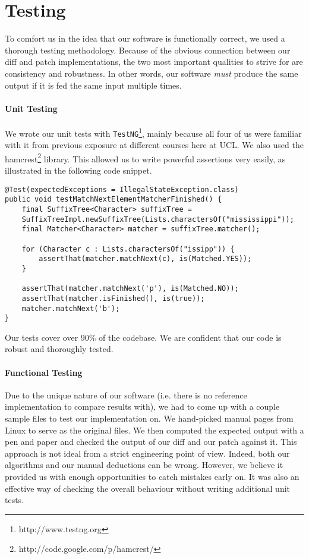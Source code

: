 \section{Testing}

To comfort us in the idea that our software is functionally correct, we used a thorough testing methodology. Because of the obvious connection between our diff and patch implementations, the two most important qualities to strive for are consistency and robustness. In other words, our software \textit{must} produce the same output if it is fed the same input multiple times.

\paragraph{Unit Testing}
We wrote our unit tests with \texttt{TestNG}\footnote{http://www.testng.org}, mainly because all four of us were familiar with it from previous exposure at different courses here at UCL. We also used the hamcrest\footnote{http://code.google.com/p/hamcrest/} library. This allowed us to write powerful assertions very easily, as illustrated in the following code snippet.

\begin{lstlisting}
@Test(expectedExceptions = IllegalStateException.class)
public void testMatchNextElementMatcherFinished() {
    final SuffixTree<Character> suffixTree = 
    SuffixTreeImpl.newSuffixTree(Lists.charactersOf("mississippi"));
    final Matcher<Character> matcher = suffixTree.matcher();

    for (Character c : Lists.charactersOf("issipp")) {
        assertThat(matcher.matchNext(c), is(Matched.YES));
    }

    assertThat(matcher.matchNext('p'), is(Matched.NO));
    assertThat(matcher.isFinished(), is(true));
    matcher.matchNext('b');
}
\end{lstlisting}

Our tests cover over 90\% of the codebase. We are confident that our code is robust and thoroughly tested.

\paragraph{Functional Testing}
Due to the unique nature of our software (i.e. there is no reference implementation to compare results with), we had to come up with a couple sample files to test our implementation on. We hand-picked manual pages from Linux to serve as the original files. We then computed the expected output with a pen and paper and checked the output of our diff and our patch against it. This approach is not ideal from a strict engineering point of view. Indeed, both our algorithms and our manual deductions can be wrong. However, we believe it provided us with enough opportunities to catch mistakes early on. It was also an effective way of checking the overall behaviour without writing additional unit tests.

